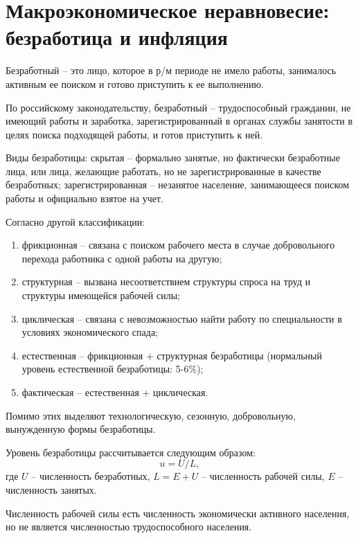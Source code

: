 \section{Макроэкономическое неравновесие: безработица и инфляция}

Безработный -- это лицо, которое в р/м периоде не имело работы, занималось
активным ее поиском и готово приступить к ее выполнению.

По российскому законодательству, безработный -- трудоспособный гражданин, не
имеющий работы и заработка, зарегистрированный в органах службы занятости в
целях поиска подходящей работы, и готов приступить к ней.

Виды безработицы: скрытая -- формально занятые, но фактически безработные лица,
или лица, желающие работать, но не зарегистрированные в качестве безработных;
зарегистрированная -- незанятое население, занимающееся поиском работы и
официально взятое на учет.

Согласно другой классификации:
\begin{enumerate}
    \item фрикционная -- связана с поиском рабочего места в случае добровольного
    перехода работника с одной работы на другую;
    \item структурная -- вызвана несоответствием структуры спроса на труд и
    структуры имеющейся рабочей силы;
    \item циклическая -- связана с невозможностью найти работу по специальности
    в условиях экономического спада;
    \item естественная -- фрикционная + структурная безработицы (нормальный
    уровень естественной безработицы: 5-6\%);
    \item фактическая -- естественная + циклическая.
\end{enumerate}

Помимо этих выделяют технологическую, сезонную, добровольную, вынужденную
формы безработицы.

Уровень безработицы рассчитывается следующим образом:
\[
    u = U/L,
\]
где \( U \) -- численность безработных, \( L = E + U \) -- численность рабочей
силы, \( E \) -- численность занятых.

Численность рабочей силы есть численность экономически активного населения, но
не является численностью трудоспособного населения.

